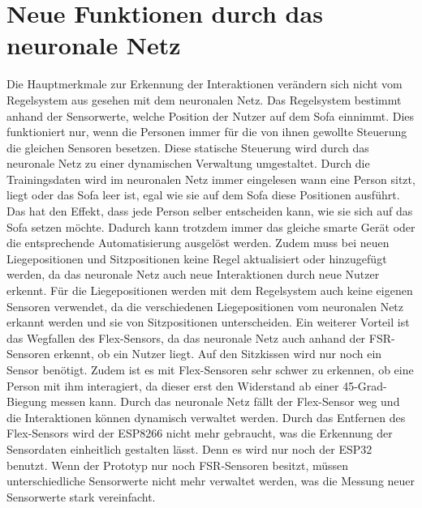 \section{Neue Funktionen durch das neuronale Netz}
\label{sec:new_func}
Die Hauptmerkmale zur Erkennung der Interaktionen verändern sich nicht vom Regelsystem aus gesehen mit dem neuronalen Netz. Das Regelsystem bestimmt anhand der Sensorwerte, welche Position der Nutzer auf dem Sofa einnimmt. Dies funktioniert nur, wenn die Personen immer für die von ihnen gewollte Steuerung die gleichen Sensoren besetzen.
\newline
Diese statische Steuerung wird durch das neuronale Netz zu einer dynamischen Verwaltung umgestaltet. Durch die Trainingsdaten wird im neuronalen Netz immer eingelesen wann eine Person sitzt, liegt oder das Sofa leer ist, egal wie sie auf dem Sofa diese Positionen ausführt. Das hat den Effekt, dass jede Person selber entscheiden kann, wie sie sich auf das Sofa setzen möchte. Dadurch kann trotzdem immer das gleiche smarte Gerät oder die entsprechende Automatisierung ausgelöst werden. Zudem muss bei neuen Liegepositionen und Sitzpositionen keine Regel aktualisiert oder hinzugefügt werden, da das neuronale Netz auch neue Interaktionen durch neue Nutzer erkennt. 
\newline
Für die Liegepositionen werden mit dem Regelsystem auch keine eigenen Sensoren verwendet, da die verschiedenen Liegepositionen vom neuronalen Netz erkannt werden und sie von Sitzpositionen unterscheiden. Ein weiterer Vorteil ist das Wegfallen des Flex-Sensors, da das neuronale Netz auch anhand der FSR-Sensoren erkennt, ob ein Nutzer liegt. Auf den Sitzkissen wird nur noch ein Sensor benötigt. Zudem ist es mit Flex-Sensoren sehr schwer zu erkennen, ob eine Person mit ihm interagiert, da dieser erst den Widerstand ab einer 45-Grad-Biegung messen kann. Durch das neuronale Netz fällt der Flex-Sensor weg und die Interaktionen können dynamisch verwaltet werden. Durch das Entfernen des Flex-Sensors wird der ESP8266 nicht mehr gebraucht, was die Erkennung der Sensordaten einheitlich gestalten lässt. Denn es wird nur noch der ESP32 benutzt. Wenn der Prototyp nur noch FSR-Sensoren besitzt, müssen unterschiedliche Sensorwerte nicht mehr verwaltet werden, was die Messung neuer Sensorwerte stark vereinfacht.

